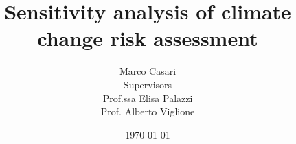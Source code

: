 \title{Sensitivity analysis of climate change risk assessment}
\author{%
  Marco Casari\\[2ex]%
  {\scriptsize Supervisors}\\%
  Prof.ssa Elisa Palazzi\\%
  Prof. Alberto Viglione\\%
}
\date{\today}  %
\maketitle
